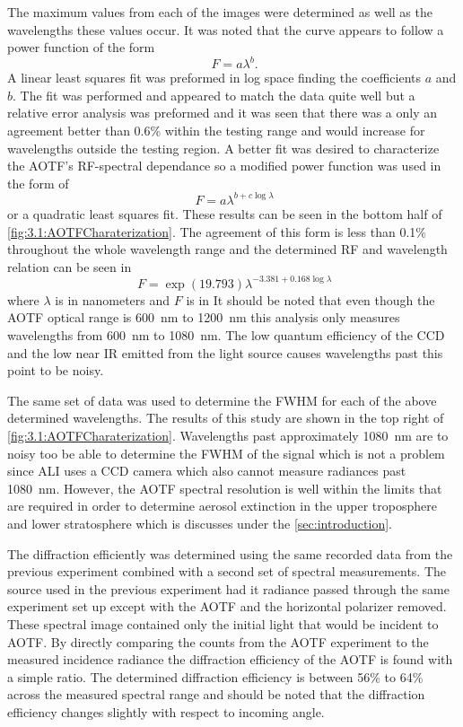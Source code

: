 \documentclass[12pt]{article}
\begin{document}
The maximum values from each of the images were determined as well as the wavelengths these values occur. It was noted that the curve appears to follow a power function of the form
\begin{equation}
    \ F = a\lambda^{b}.
    \label{eqn:3.1:powerFunction}
\end{equation}
A linear least squares fit was preformed in log space finding the coefficients $a$ and $b$. The fit was performed and appeared to match the data quite well but a relative error analysis was preformed and it was seen that there was a only an agreement better than 0.6\% within the testing range and would increase for wavelengths outside the testing region. A better fit was desired to characterize the AOTF's RF-spectral dependance so a modified power function was used in the form of
 \begin{equation}
    \ F = a\lambda^{b+c\log\lambda}
    \label{eqn:3.1:modifiedPowerFunction}
\end{equation}
or a quadratic least squares fit. These results can be seen in the bottom half of \autoref{fig:3.1:AOTFCharaterization}. The agreement of this form is less than 0.1\% throughout the whole wavelength range and the determined RF and wavelength relation can be seen in
\begin{equation}
    \ F = \exp{(19.793)}\lambda^{-3.381+0.168\log\lambda}
    \label{eqn:3.1:modifiedPowerFunctionCoeffiecicents}
\end{equation}
where $\lambda$ is in nanometers and $F$ is in It should be noted that even though the AOTF optical range is 600~nm to 1200~nm this analysis only measures wavelengths from 600~nm to 1080~nm. The low quantum efficiency of the CCD and the low near IR emitted from the light source causes wavelengths past this point to be noisy.

The same set of data was used to determine the FWHM for each of the above determined wavelengths. The results of this study are shown in the top right of \autoref{fig:3.1:AOTFCharaterization}. Wavelengths past approximately 1080~nm are to noisy too be able to determine the FWHM of the signal which is not a problem since ALI uses a CCD camera which also cannot measure radiances past 1080~nm. However, the AOTF spectral resolution is well within the limits that are required in order to determine aerosol extinction in the upper troposphere and lower stratosphere which is discusses under the \autoref{sec:introduction}.

The diffraction efficiently was determined using the same recorded data from the previous experiment combined with a second set of spectral measurements. The source used in the previous experiment had it radiance passed through the same experiment set up except with the AOTF and the horizontal polarizer removed. These spectral image contained only the initial light that would be incident to AOTF. By directly comparing the counts from the AOTF experiment to the measured incidence radiance the diffraction efficiency of the AOTF is found with a simple ratio. The determined diffraction efficiency is between 56\% to 64\% across the measured spectral range and should be noted that the diffraction efficiency changes slightly with respect to incoming angle.
\end{document}
